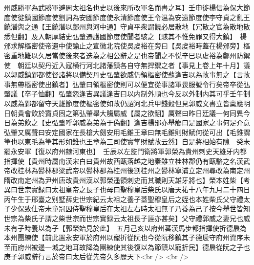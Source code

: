 州威勝軍為武勝軍避周太祖名也史以後來所改軍名而書之耳】壬申徙楊信為保大節度使徙鎮國節度使劉詞為安國節度使永清節度使王令温為安遠節度使李守貞之亂王饒潛與之通【王饒潛以鄜州與河中通】守貞平衆謂饒必居散地【冗散之官為散地散悉但翻】及入朝厚結史弘肇遷護國節度使聞者駭之【駭其不惟免罪又得大鎮】　楊邠求解樞密使帝遺中使諭止之宣徽北院使吳䖍裕在旁曰【吳䖍裕時蓋在楊邠旁】樞密重地難以久居當使後來者迭為之相公辭之是也帝聞之不悦辛巳以䖍裕為鄭州防禦使　朝廷以契丹近入寇横行河北諸藩鎮各自守無捍禦之者【事見上卷上年十月】議以郭威鎮鄴都使督諸將以備契丹史弘肇欲威仍領樞密使蘇逢吉以為故事無之【言故事無帶樞密使出鎮者】弘肇曰領樞密使則可以便宜從事諸軍畏服號令行矣帝卒從弘肇議【卒子恤翻】弘肇怨逢吉異議逢吉曰以内制外順也今反以外制内其可乎壬午制以威為鄴都留守天雄節度使樞密使如故仍詔河北兵甲錢糓但見郭威文書立皆稟應明日朝貴會飲於竇貞固之第弘肇舉大觴屬威【屬之欲翻】厲聲曰昨日廷議一何同異今日為弟飲之【史弘肇呼郭威為弟為于偽翻】逢吉楊邠亦舉觴曰是國家之事何足介意弘肇又厲聲曰安定國家在長槍大劒安用毛錐王章曰無毛錐則財賦何從可出【毛錐謂筆也以東毛為筆其形如錐也王章為三司使實掌財賦故云然】自是將相始有隙　癸未罷永安軍【復以府州隸河東也】　壬辰以左監門衛將軍郭榮為貴州刺史天雄牙内都指揮使【貴州時屬南漢宋白曰貴州故西甌落越之地秦雖立桂林郡仍有甌駱之名漢武帝改桂林為鬰林郡梁武帝以鬰林郡為桂州後割桂州之鬰林寧浦立定州尋改為南定州隋改南定州為尹州唐改貴州漢以郭榮遥領刺史而其職則天雄牙將也】榮本姓柴【考異曰世宗實録曰太祖皇帝之長子也母曰聖穆皇后柴氏以唐天祐十八年九月二十四日丙午生于邢臺之别墅薛史世宗紀云太祖之養子蓋聖穆皇后之姪也本姓柴氏父守禮太子少保致仕帝未童冠因侍聖穆皇后在太祖左右時太祖無子乃養為己子按今舉世皆知世宗為柴氏子謂之柴世宗而世宗實録云太祖長子誣亦甚矣】父守禮郭威之妻兄也威未有子時養以為子【郭榮始見於此】　五月己亥以府州蕃漢馬步都指揮使折德扆為本州團練使【前此置永安軍於府州以寵折從阮也今從阮移鎮其子德扆守府州資序未至而府州被邊一城之地耳故降為團練使其後復以為節鎮以寵折民】德扆從阮之子也庚子郭威辭行言於帝曰太后從先帝久多歷天下<br />
<br />
